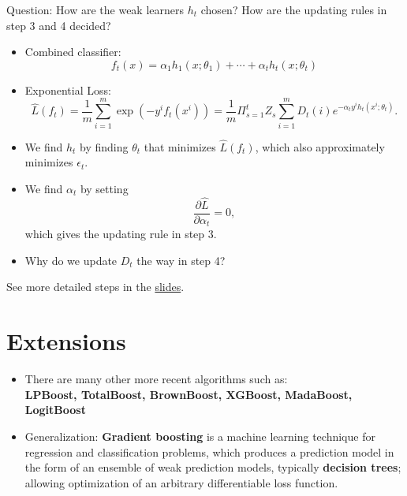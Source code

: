 \documentclass[twoside,12pt]{article}
\begin{document}
\noindent Question: How are the weak learners $h_t$ chosen? How are the updating rules in step 3 and 4 decided?
\begin{itemize}
\item Combined classifier: $$f_t(x) = \alpha_1 h_1(x; \theta_1) + \cdots +  \alpha_t h_t(x; \theta_t)$$
\item Exponential Loss: $$\hat{L}(f_t) = \frac 1 m \sum_{i = 1}^m \exp(-y^if_t(x^i)) =\frac 1 m \Pi_{s=1}^t Z_s \sum_{i=1}^m D_t(i) e^{-\alpha_t y^i h_t(x^i;\theta_t)}. $$
\item We find $h_t$ by finding $\theta_t$ that minimizes $\hat{L}(f_t)$, which also approximately minimizes $\epsilon_t$. 
\item We find $\alpha_t$ by setting $$\frac{\partial \hat{L}}{\partial \alpha_t} = 0,$$ which gives the updating rule in step 3.
\item Why do we update $D_t$ the way in step 4?
\end{itemize}
See more detailed steps in the  \href{https://github.com/sliao7/CSE6740\_Computational\_Data\_Analysis/blob/main/slides/boosting.pdf}{slides}.

\section{Extensions}
\begin{itemize}
\item There are many other more recent algorithms such as: \\
\textbf{LPBoost, TotalBoost, BrownBoost, XGBoost, MadaBoost, LogitBoost}
\item Generalization: \textbf{Gradient boosting} is a machine learning technique for regression and classification problems, which produces a prediction model in the form of an ensemble of weak prediction models, typically \textbf{decision trees}; allowing optimization of an arbitrary differentiable loss function. 
\end{itemize}
\end{document}
